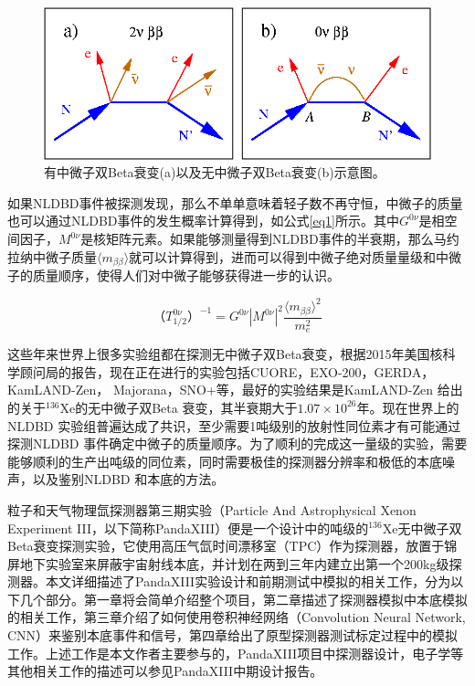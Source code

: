 \begin{figure}
    \centering
    \includegraphics[width=0.5\columnwidth]{pic/nldbd.png}
    \caption{有中微子双Beta衰变(a)以及无中微子双Beta衰变(b)示意图。}
    \label{fig:nldbd}
\end{figure}

如果NLDBD事件被探测发现，那么不单单意味着轻子数不再守恒，中微子的质量也可以通过NLDBD事件的发生概率计算得到，如公式\ref{eq1}所示\supercite{avignone2008double}。其中$G^{0\nu}$是相空间因子，$M^{0\nu}$是核矩阵元素。如果能够测量得到NLDBD事件的半衰期，那么马约拉纳中微子质量$\langle m_{\beta\beta}\rangle$就可以计算得到，进而可以得到中微子绝对质量量级和中微子的质量顺序，使得人们对中微子能够获得进一步的认识。

\begin{equation}
    （T_{1/2}^{0\nu}）^{-1}=G^{0\nu}|M^{0\nu}|^2\frac{\langle m_{\beta\beta}\rangle ^2}{m_e^2}
    \label{eq1}
\end{equation}

这些年来世界上很多实验组都在探测无中微子双Beta衰变，根据2015年美国核科学顾问局的报告\supercite{NLDBD_NSAC}，现在正在进行的实验包括CUORE\supercite{Artusa:2014lgv}，EXO-200\supercite{Albert:2014awa}，GERDA\supercite{Agostini:2016iid}，
KamLAND-Zen\supercite{KamLAND-Zen:2016pfg}，
Majorana\supercite{Abgrall:2013rze}，SNO+\supercite{Andringa:2015tza}等，最好的实验结果是KamLAND-Zen
给出的关于$^{136}$Xe的无中微子双Beta
衰变，其半衰期大于$1.07\times10^{26}$年。现在世界上的NLDBD
实验组普遍达成了共识，至少需要1吨级别的放射性同位素才有可能通过探测NLDBD
事件确定中微子的质量顺序。为了顺利的完成这一量级的实验，需要能够顺利的生产出吨级的同位素，同时需要极佳的探测器分辨率和极低的本底噪声，以及鉴别NLDBD
和本底的方法。

粒子和天气物理氙探测器第三期实验（Particle And Astrophysical Xenon Experiment III，以下简称PandaXIII）便是一个设计中的吨级的$^{136}$Xe无中微子双Beta衰变探测实验，它使用高压气氙时间漂移室（TPC）作为探测器，放置于锦屏地下实验室来屏蔽宇宙射线本底，并计划在两到三年内建立出第一个200kg级探测器。本文详细描述了PandaXIII实验设计和前期测试中模拟的相关工作，分为以下几个部分。第一章将会简单介绍整个项目，第二章描述了探测器模拟中本底模拟的相关工作，第三章介绍了如何使用卷积神经网络（Convolution Neural Network, CNN）来鉴别本底事件和信号，第四章给出了原型探测器测试标定过程中的模拟工作。上述工作是本文作者主要参与的，PandaXIII项目中探测器设计，电子学等其他相关工作的描述可以参见PandaXIII中期设计报告\supercite{cdr}。

